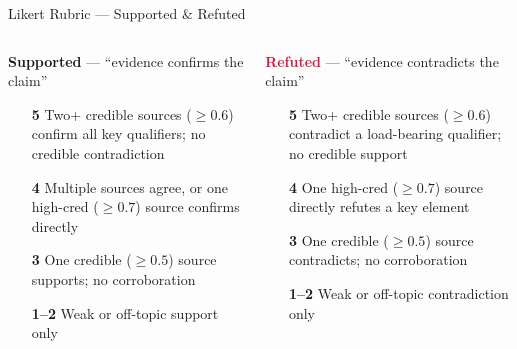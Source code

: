 \documentclass[11pt, aspectratio=169]{beamer}
\begin{document}
\begin{frame}{Likert Rubric — Supported \& Refuted}
  \begin{columns}[T]
    \begin{column}{0.48\textwidth}
      \textbf{\textcolor{forestg}{Supported}} — ``evidence confirms the claim''
      \begin{itemize}\setlength{\itemsep}{8pt}
        \item[\textbf{5}] Two+ credible sources ($\geq 0.6$) confirm all key qualifiers; no credible contradiction
        \item[\textbf{4}] Multiple sources agree, or one high-cred ($\geq 0.7$) source confirms directly
        \item[\textbf{3}] One credible ($\geq 0.5$) source supports; no corroboration
        \item[\textbf{1--2}] Weak or off-topic support only
      \end{itemize}
    \end{column}
    \begin{column}{0.48\textwidth}
      \textbf{\textcolor{crimson}{Refuted}} — ``evidence contradicts the claim''
      \begin{itemize}\setlength{\itemsep}{8pt}
        \item[\textbf{5}] Two+ credible sources ($\geq 0.6$) contradict a load-bearing qualifier; no credible support
        \item[\textbf{4}] One high-cred ($\geq 0.7$) source directly refutes a key element
        \item[\textbf{3}] One credible ($\geq 0.5$) source contradicts; no corroboration
        \item[\textbf{1--2}] Weak or off-topic contradiction only
      \end{itemize}
    \end{column}
  \end{columns}
\end{frame}
\end{document}
